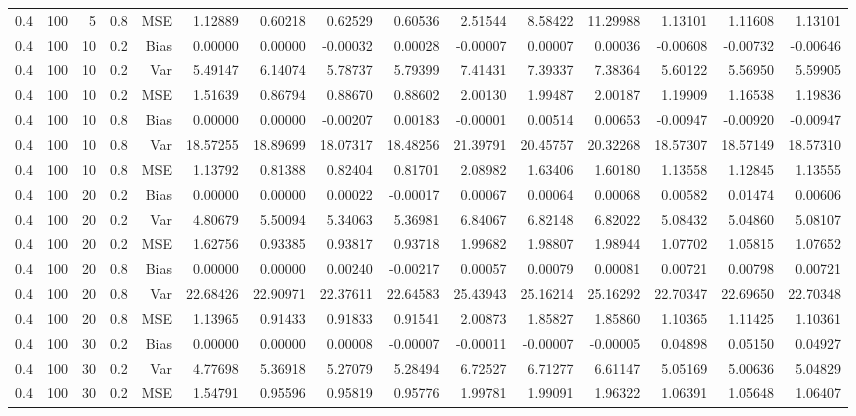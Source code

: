 \begin{table}[!htbp]
\begin{tabular}{lrrrrrrrrrrrrrr}
0.4 & 100 &  5 & 0.8 & MSE & 1.12889 & 0.60218 & 0.62529 & 0.60536 & 2.51544 & 8.58422 & 11.29988 & 1.13101 & 1.11608 & 1.13101 \\
0.4 & 100 & 10 & 0.2 & Bias & 0.00000 & 0.00000 & -0.00032 & 0.00028 & -0.00007 & 0.00007 & 0.00036 & -0.00608 & -0.00732 & -0.00646 \\
0.4 & 100 & 10 & 0.2 & Var & 5.49147 & 6.14074 & 5.78737 & 5.79399 & 7.41431 & 7.39337 & 7.38364 & 5.60122 & 5.56950 & 5.59905 \\
0.4 & 100 & 10 & 0.2 & MSE & 1.51639 & 0.86794 & 0.88670 & 0.88602 & 2.00130 & 1.99487 & 2.00187 & 1.19909 & 1.16538 & 1.19836 \\
0.4 & 100 & 10 & 0.8 & Bias & 0.00000 & 0.00000 & -0.00207 & 0.00183 & -0.00001 & 0.00514 & 0.00653 & -0.00947 & -0.00920 & -0.00947 \\
0.4 & 100 & 10 & 0.8 & Var & 18.57255 & 18.89699 & 18.07317 & 18.48256 & 21.39791 & 20.45757 & 20.32268 & 18.57307 & 18.57149 & 18.57310 \\
0.4 & 100 & 10 & 0.8 & MSE & 1.13792 & 0.81388 & 0.82404 & 0.81701 & 2.08982 & 1.63406 & 1.60180 & 1.13558 & 1.12845 & 1.13555 \\
0.4 & 100 & 20 & 0.2 & Bias & 0.00000 & 0.00000 & 0.00022 & -0.00017 & 0.00067 & 0.00064 & 0.00068 & 0.00582 & 0.01474 & 0.00606 \\
0.4 & 100 & 20 & 0.2 & Var & 4.80679 & 5.50094 & 5.34063 & 5.36981 & 6.84067 & 6.82148 & 6.82022 & 5.08432 & 5.04860 & 5.08107 \\
0.4 & 100 & 20 & 0.2 & MSE & 1.62756 & 0.93385 & 0.93817 & 0.93718 & 1.99682 & 1.98807 & 1.98944 & 1.07702 & 1.05815 & 1.07652 \\
0.4 & 100 & 20 & 0.8 & Bias & 0.00000 & 0.00000 & 0.00240 & -0.00217 & 0.00057 & 0.00079 & 0.00081 & 0.00721 & 0.00798 & 0.00721 \\
0.4 & 100 & 20 & 0.8 & Var & 22.68426 & 22.90971 & 22.37611 & 22.64583 & 25.43943 & 25.16214 & 25.16292 & 22.70347 & 22.69650 & 22.70348 \\
0.4 & 100 & 20 & 0.8 & MSE & 1.13965 & 0.91433 & 0.91833 & 0.91541 & 2.00873 & 1.85827 & 1.85860 & 1.10365 & 1.11425 & 1.10361 \\
0.4 & 100 & 30 & 0.2 & Bias & 0.00000 & 0.00000 & 0.00008 & -0.00007 & -0.00011 & -0.00007 & -0.00005 & 0.04898 & 0.05150 & 0.04927 \\
0.4 & 100 & 30 & 0.2 & Var & 4.77698 & 5.36918 & 5.27079 & 5.28494 & 6.72527 & 6.71277 & 6.61147 & 5.05169 & 5.00636 & 5.04829 \\
0.4 & 100 & 30 & 0.2 & MSE & 1.54791 & 0.95596 & 0.95819 & 0.95776 & 1.99781 & 1.99091 & 1.96322 & 1.06391 & 1.05648 & 1.06407 \\

\end{tabular}
\end{table}
